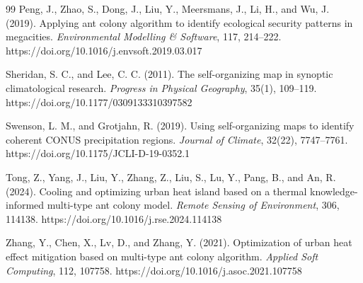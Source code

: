 \documentclass[11pt]{article}
\begin{document}
\begin{thebibliography}{99}
Peng, J., Zhao, S., Dong, J., Liu, Y., Meersmans, J., Li, H., and Wu, J. (2019).
Applying ant colony algorithm to identify ecological security patterns in megacities.
\textit{Environmental Modelling \& Software}, 117, 214--222.
https://doi.org/10.1016/j.envsoft.2019.03.017

Sheridan, S. C., and Lee, C. C. (2011).
The self-organizing map in synoptic climatological research.
\textit{Progress in Physical Geography}, 35(1), 109--119.
https://doi.org/10.1177/0309133310397582

Swenson, L. M., and Grotjahn, R. (2019).
Using self-organizing maps to identify coherent CONUS precipitation regions.
\textit{Journal of Climate}, 32(22), 7747--7761.
https://doi.org/10.1175/JCLI-D-19-0352.1

Tong, Z., Yang, J., Liu, Y., Zhang, Z., Liu, S., Lu, Y., Pang, B., and An, R. (2024).
Cooling and optimizing urban heat island based on a thermal knowledge-informed multi-type ant colony model.
\textit{Remote Sensing of Environment}, 306, 114138.
https://doi.org/10.1016/j.rse.2024.114138

Zhang, Y., Chen, X., Lv, D., and Zhang, Y. (2021).
Optimization of urban heat effect mitigation based on multi-type ant colony algorithm.
\textit{Applied Soft Computing}, 112, 107758.
https://doi.org/10.1016/j.asoc.2021.107758

\end{thebibliography}
\end{document}
